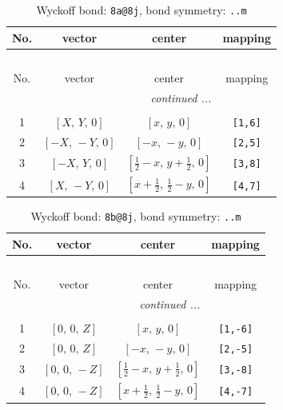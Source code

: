 \documentclass[fleqn,8pt]{jsarticle}
\begin{document}
\begin{longtable}{cccc}
\caption{Wyckoff bond: {\tt 8a@8j}, bond symmetry: {\tt ..m}}
 \\
 \hline \hline
No. & vector & center & mapping \\ \hline \endfirsthead

\multicolumn{3}{l}{\tablename\ \thetable{}} \\
 \hline \hline
No. & vector & center & mapping \\ \hline \endhead

 \hline \hline
\multicolumn{3}{r}{\footnotesize\it continued ...} \\ \endfoot

 \hline \hline
\multicolumn{3}{r}{} \\ \endlastfoot

1 & $\left[ X,\, Y,\, 0 \right]$ & $\left[ x,\, y,\, 0 \right]$ & {\tt [1,6]} \\ \hline
2 & $\left[ - X,\, - Y,\, 0 \right]$ & $\left[ - x,\, - y,\, 0 \right]$ & {\tt [2,5]} \\ \hline
3 & $\left[ - X,\, Y,\, 0 \right]$ & $\left[ \frac{1}{2} - x,\, y + \frac{1}{2},\, 0 \right]$ & {\tt [3,8]} \\ \hline
4 & $\left[ X,\, - Y,\, 0 \right]$ & $\left[ x + \frac{1}{2},\, \frac{1}{2} - y,\, 0 \right]$ & {\tt [4,7]} \\
\end{longtable}
\renewcommand{\arraystretch}{1.2}
\begin{longtable}{cccc}
\caption{Wyckoff bond: {\tt 8b@8j}, bond symmetry: {\tt ..m}}
 \\
 \hline \hline
No. & vector & center & mapping \\ \hline \endfirsthead

\multicolumn{3}{l}{\tablename\ \thetable{}} \\
 \hline \hline
No. & vector & center & mapping \\ \hline \endhead

 \hline \hline
\multicolumn{3}{r}{\footnotesize\it continued ...} \\ \endfoot

 \hline \hline
\multicolumn{3}{r}{} \\ \endlastfoot

1 & $\left[ 0,\, 0,\, Z \right]$ & $\left[ x,\, y,\, 0 \right]$ & {\tt [1,-6]} \\ \hline
2 & $\left[ 0,\, 0,\, Z \right]$ & $\left[ - x,\, - y,\, 0 \right]$ & {\tt [2,-5]} \\ \hline
3 & $\left[ 0,\, 0,\, - Z \right]$ & $\left[ \frac{1}{2} - x,\, y + \frac{1}{2},\, 0 \right]$ & {\tt [3,-8]} \\ \hline
4 & $\left[ 0,\, 0,\, - Z \right]$ & $\left[ x + \frac{1}{2},\, \frac{1}{2} - y,\, 0 \right]$ & {\tt [4,-7]} \\
\end{longtable}
\end{document}
